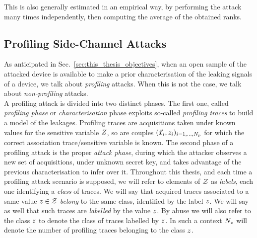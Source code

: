 This is also generally estimated in an empirical way, by performing the attack many times independently, then computing the average of the obtained ranks. 



\subsection{Profiling Side-Channel Attacks}\label{sec:profilingSCA}
As anticipated in Sec.~\ref{sec:this_thesis_objectives}, when an open sample of the attacked device is available to make a prior characterisation of the leaking signals of a device, we talk about \emph{profiling} attacks. When this is not the case, we talk about \emph{non-profiling} attacks. \\
A profiling attack is divided into two distinct phases. The first one, called \emph{profiling phase} or \emph{characterisation} phase exploits so-called \emph{profiling traces} to build a model of the leakages. Profiling traces are acquisitions taken under known values for the sensitive variable $Z$, so are couples $(\vec{x}_i, z_i)_{i=1, \dots , N_p}$ for which the correct association trace/sensitive variable is known. The second phase of a profiling attack is the proper \emph{attack phase}, during which the attacker observes a new set of acquisitions, under unknown secret key, and takes advantage of the previous characterisation to infer over it. Throughout this thesis, and each time a profiling attack scenario is supposed,  we will refer to elements of $\mathcal{Z}$ as \emph{labels}, each one identifying a \emph{class} of traces. We will say that acquired traces associated to a same value $z\in\mathcal{Z}$ \emph{belong} to the same class, identified by the label $z$. We will say as well that such traces are  \emph{labelled} by the value $z$. By abuse we will also refer to the class $z$ to denote the class of traces labelled by $z$. In such a context $N_{z}$ will denote the number of profiling traces belonging to the class $z$.




